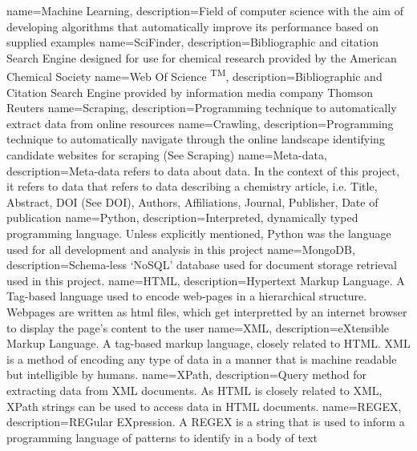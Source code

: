 {
name={Machine Learning},
description={Field of computer science with the aim of developing algorithms that automatically improve its performance based on supplied examples \cite{glossarymachinelearning}} 
}
{
name={SciFinder\textsuperscript{\textregistered}},
description={Bibliographic and citation Search Engine designed for use for chemical research provided by the American Chemical Society} 
}
{
name={Web Of Science	\textsuperscript{TM}},
description={Bibliographic and Citation Search Engine provided by information media company Thomson Reuters } 
}
{
name={Scraping},
description={Programming technique to automatically extract data from online resources } 
}
{
name={Crawling},
description={Programming technique to automatically navigate through the online landscape identifying candidate websites for scraping (See Scraping)} 
}
{
name={Meta-data},
description={Meta-data refers to data about data. In the context of this project, it refers to data that refers to data describing a chemistry article, i.e. Title, Abstract, DOI (See DOI), Authors, Affiliations, Journal, Publisher, Date of publication}
}
{
name={Python},
description={Interpreted, dynamically typed programming language. Unless explicitly mentioned, Python was the language used for all development and analysis in this project} 
}
{
name={MongoDB},
description={Schema-less `NoSQL' database used for document storage retrieval used in this project.} 
}
{
name={HTML},
description={Hypertext Markup Language. A Tag-based language used to encode web-pages in a hierarchical structure. Webpages are written as html files, which get interpretted by an internet browser to display the page's content to the user } 
}
{
name={XML},
description={eXtensible Markup Language. A tag-based markup language, closely related to HTML. XML is a method of encoding any type of data in a manner that is machine readable but intelligible by humans. } 
}
{
name={XPath},
description={Query method for extracting data from XML documents. As HTML is closely related to XML, XPath strings can be used to access data in HTML documents. } 
}
{
name={REGEX},
description={REGular EXpression. A REGEX is a string that is used to inform a programming language of patterns to identify in a body of text} 
}
